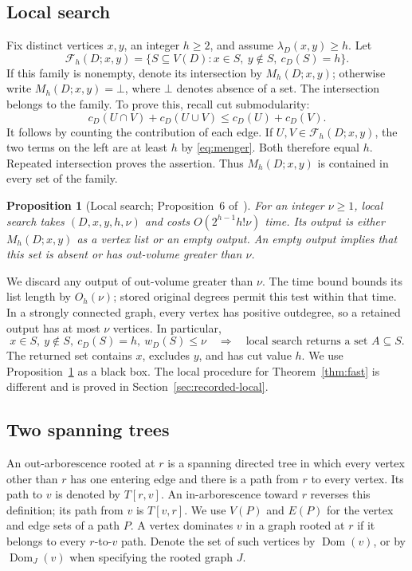 \documentclass[11pt]{article}
\newtheorem{proposition}[theorem]{Proposition}
\theoremstyle{definition}
\theoremstyle{remark}
\newcommand{\Dom}{\operatorname{Dom}}
\begin{document}
\subsection{Local search}
\label{sec:local}
Fix distinct vertices \(x,y\), an integer \(h\ge2\), and assume \(\lambda_D(x,y)\ge h\). Let
\[
 \mathcal F_h(D;x,y)=\{S\subseteq V(D):x\in S,\ y\notin S,\ c_D(S)=h\}.
\]
If this family is nonempty, denote its intersection by \(M_h(D;x,y)\); otherwise write \(M_h(D;x,y)=\bot\), where \(\bot\) denotes absence of a set. The intersection belongs to the family. To prove this, recall cut submodularity:
\begin{equation}
 c_D(U\cap V)+c_D(U\cup V)\le c_D(U)+c_D(V).
 \label{eq:submod}
\end{equation}
It follows by counting the contribution of each edge. If \(U,V\in\mathcal F_h(D;x,y)\), the two terms on the left are at least \(h\) by \eqref{eq:menger}. Both therefore equal \(h\). Repeated intersection proves the assertion. Thus \(M_h(D;x,y)\) is contained in every set of the family.

\begin{proposition}[Local search; Proposition~6 of~\cite{GKKPP26}]
\label{prop:local}
For an integer \(\nu\ge1\), local search takes \((D,x,y,h,\nu)\) and costs \(O(2^{h-1}h!\nu)\) time. Its output is either \(M_h(D;x,y)\) as a vertex list or an empty output. An empty output implies that this set is absent or has out-volume greater than \(\nu\).
\end{proposition}
We discard any output of out-volume greater than \(\nu\). The time bound bounds its list length by \(O_h(\nu)\); stored original degrees permit this test within that time. In a strongly connected graph, every vertex has positive outdegree, so a retained output has at most \(\nu\) vertices. In particular,
\begin{equation}
 x\in S,\ y\notin S,\ c_D(S)=h,\ w_D(S)\le\nu
 \quad\Longrightarrow\quad
 \text{local search returns a set }A\subseteq S.
 \label{eq:local-containment}
\end{equation}
The returned set contains \(x\), excludes \(y\), and has cut value \(h\). We use Proposition~\ref{prop:local} as a black box. The local procedure for Theorem~\ref{thm:fast} is different and is proved in Section~\ref{sec:recorded-local}.

\subsection{Two spanning trees}
An out-arborescence rooted at \(r\) is a spanning directed tree in which every vertex other than \(r\) has one entering edge and there is a path from \(r\) to every vertex. Its path to \(v\) is denoted by \(T[r,v]\). An in-arborescence toward \(r\) reverses this definition; its path from \(v\) is \(T[v,r]\). We use \(V(P)\) and \(E(P)\) for the vertex and edge sets of a path \(P\).
A vertex dominates \(v\) in a graph rooted at \(r\) if it belongs to every \(r\)-to-\(v\) path. Denote the set of such vertices by \(\Dom(v)\), or by \(\Dom_J(v)\) when specifying the rooted graph \(J\).
\end{document}
